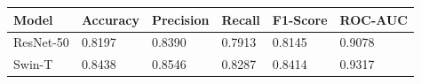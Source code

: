 
\begin{tabular}{llllll}
\toprule
Model & Accuracy & Precision & Recall & F1-Score & ROC-AUC \\
\midrule
ResNet-50 & 0.8197 & 0.8390 & 0.7913 & 0.8145 & 0.9078 \\
Swin-T & 0.8438 & 0.8546 & 0.8287 & 0.8414 & 0.9317 \\
\bottomrule
\end{tabular}
